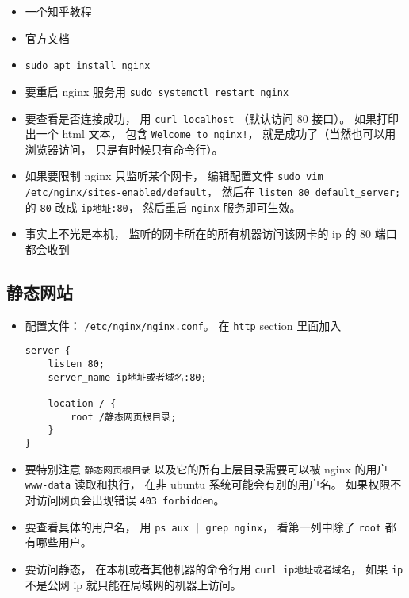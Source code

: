 
\begin{issues}
\issueDraft
\end{issues}

\begin{itemize}
\item 一个\href{https://zhuanlan.zhihu.com/p/80600540}{知乎教程}
\item \href{https://nginx.org/en/docs/}{官方文档}
\item \verb|sudo apt install nginx|
\item 要重启 nginx 服务用 \verb|sudo systemctl restart nginx|
\item 要查看是否连接成功， 用 \verb|curl localhost| （默认访问 80 接口）。 如果打印出一个 html 文本， 包含 \verb|Welcome to nginx!|， 就是成功了（当然也可以用浏览器访问， 只是有时候只有命令行）。
\item 如果要限制 nginx 只监听某个网卡， 编辑配置文件 \verb|sudo vim /etc/nginx/sites-enabled/default|， 然后在 \verb|listen 80 default_server;| 的 \verb|80| 改成 \verb|ip地址:80|， 然后重启 \verb|nginx| 服务即可生效。
\item 事实上不光是本机， 监听的网卡所在的所有机器访问该网卡的 ip 的 80 端口都会收到
\end{itemize}

\subsection{静态网站}
\begin{itemize}
\item 配置文件： \verb|/etc/nginx/nginx.conf|。 在 \verb|http| section 里面加入
\begin{lstlisting}[language=none]
server {
    listen 80;
    server_name ip地址或者域名:80;
    
    location / {
        root /静态网页根目录;
    }
}
\end{lstlisting}
\item 要特别注意 \verb|静态网页根目录| 以及它的所有上层目录需要可以被 nginx 的用户 \verb|www-data| 读取和执行， 在非 ubuntu 系统可能会有别的用户名。 如果权限不对访问网页会出现错误 \verb|403 forbidden|。
\item 要查看具体的用户名， 用 \verb`ps aux | grep nginx`， 看第一列中除了 \verb|root| 都有哪些用户。
\item 要访问静态， 在本机或者其他机器的命令行用 \verb|curl ip地址或者域名|， 如果 \verb|ip| 不是公网 ip 就只能在局域网的机器上访问。
\end{itemize}
